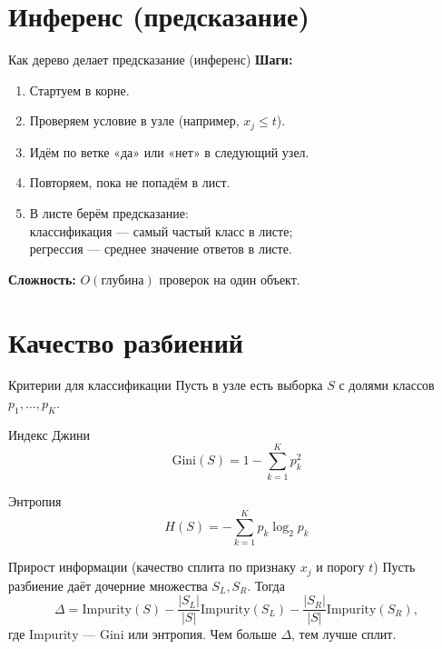 \documentclass[12pt]{beamer}
\begin{document}
\section{Инференс (предсказание)}

\begin{frame}{Как дерево делает предсказание (инференс)}
	\textbf{Шаги:}
	\begin{enumerate}
		\item Стартуем в корне.
		\item Проверяем условие в узле (например, $x_j \le t$).
		\item Идём по ветке «да» или «нет» в следующий узел.
		\item Повторяем, пока не попадём в лист.
		\item В листе берём предсказание: \\
		      \quad классификация — самый частый класс в листе; \\
		      \quad регрессия — среднее значение ответов в листе.
	\end{enumerate}
	\vspace{3mm}
	\textbf{Сложность:} $O(\text{глубина})$ проверок на один объект.
\end{frame}

\section{Качество разбиений}

\begin{frame}{Критерии для классификации}
	Пусть в узле есть выборка $S$ с долями классов $p_1,\dots,p_K$.
	\begin{block}{Индекс Джини}
		\[
			\mathrm{Gini}(S) = 1 - \sum_{k=1}^{K} p_k^2
		\]
	\end{block}
	\begin{block}{Энтропия}
		\[
			H(S) = - \sum_{k=1}^{K} p_k \log_2 p_k
		\]
	\end{block}
\end{frame}
\begin{frame}
	\begin{block}{Прирост информации (качество сплита по признаку $x_j$ и порогу $t$)}
		Пусть разбиение даёт дочерние множества $S_L, S_R$. Тогда
		\[
			\Delta = \mathrm{Impurity}(S) - \frac{|S_L|}{|S|}\mathrm{Impurity}(S_L) - \frac{|S_R|}{|S|}\mathrm{Impurity}(S_R),
		\]
		где $\mathrm{Impurity}$ — Gini или энтропия. Чем больше $\Delta$, тем лучше сплит.
	\end{block}
\end{frame}
\end{document}
